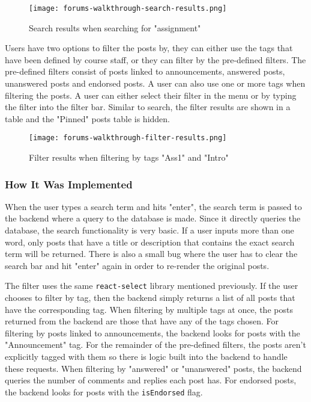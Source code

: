 \begin{figure}[h!]
    \texttt{[image: forums-walkthrough-search-results.png]}
    \centering
    \caption{Search results when searching for "assignment"}
\end{figure}

Users have two options to filter the posts by, they can either use the tags that have been defined by course staff, or they can filter by the pre-defined filters.
The pre-defined filters consist of posts linked to announcements, answered posts, unanswered posts and endorsed posts.
A user can also use one or more tags when filtering the posts.
A user can either select their filter in the menu or by typing the filter into the filter bar.
Similar to search, the filter results are shown in a table and the "Pinned" posts table is hidden.

\begin{figure}[h!]
    \texttt{[image: forums-walkthrough-filter-results.png]}
    \centering
    \caption{Filter results when filtering by tags "Ass1" and "Intro"}
\end{figure}

\subsubsection{How It Was Implemented}
When the user types a search term and hits "enter", the search term is passed to the backend where a query to the database is made.
Since it directly queries the database, the search functionality is very basic.
If a user inputs more than one word, only posts that have a title or description that contains the exact search term will be returned.
There is also a small bug where the user has to clear the search bar and hit "enter" again in order to re-render the original posts.

The filter uses the same \texttt{react-select} library mentioned previously.
If the user chooses to filter by tag, then the backend simply returns a list of all posts that have the corresponding tag.
When filtering by multiple tags at once, the posts returned from the backend are those that have any of the tags chosen.
For filtering by posts linked to announcements, the backend looks for posts with the "Announcement" tag.
For the remainder of the pre-defined filters, the posts aren't explicitly tagged with them so there is logic built into the backend to handle these requests.
When filtering by "answered" or "unanswered" posts, the backend queries the number of comments and replies each post has.
For endorsed posts, the backend looks for posts with the \texttt{isEndorsed} flag.

